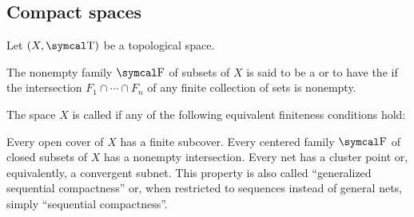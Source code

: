 \subsection{Compact spaces}\label{subsec:compact_spaces}

Let \( (X, \CT) \) be a topological space.

\begin{definition}\label{def:centered_family}\cite[123]{Engelking1989}
  The nonempty family \( \CF \) of subsets of \( X \) is said to be a  or to have the  if the intersection \( F_1 \cap \cdots \cap F_n \) of any finite collection of sets is nonempty.
\end{definition}

\begin{definition}\label{def:compact_space}\cite[123]{Engelking1989}
  The space \( X \) is called  if any of the following equivalent finiteness conditions hold:
  \begin{defenum}
     Every open cover of \( X \) has a finite subcover.
     Every centered family \( \CF \) of closed subsets of \( X \) has a nonempty intersection.
     Every net has a cluster point or, equivalently, a convergent subnet. This property is also called \enquote{generalized sequential compactness} or, when restricted to sequences instead of general nets, simply \enquote{sequential compactness}.
  \end{defenum}
\end{definition}
